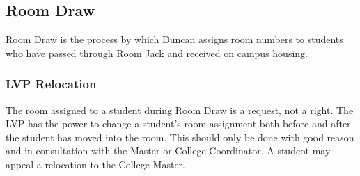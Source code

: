 \documentclass[USletter,12pt]{article}
\begin{document}
\subsection{Room Draw}

Room Draw is the process by which Duncan assigns room numbers to students who have passed through Room Jack and received on campus housing.

\subsubsection{LVP Relocation}
The room assigned to a student during Room Draw is a request, not a right.  The LVP has the power to change a student's room assignment both before and after the student has moved into the room.  This should only be done with good reason and in consultation with the Master or College Coordinator.  A student may appeal a relocation to the College Master.
\end{document}
